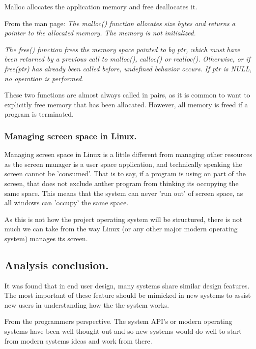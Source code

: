 \documentclass[a4paper]{report}
\begin{document}
Malloc allocates the application memory and free deallocates it.

From the man page:
\textit{The malloc() function allocates size bytes and returns a pointer to the allocated memory.  The memory is not initialized.}

\textit{The free() function frees the memory space pointed  to  by  ptr,  which must  have  been  returned  by a previous call to malloc(), calloc() or realloc().  Otherwise, or if free(ptr) has already been called  before, undefined behavior occurs.  If ptr is NULL, no operation is performed.} \cite{manMalloc}

These two functions are almost always called in pairs, as it is common to want to explicitly free memory that has been allocated. However, all memory is freed if a program is terminated.


\subsubsection*{Managing screen space in Linux.}

Managing screen space in Linux is a little different from managing other resources as the screen manager is a user space application, and technically speaking the screen cannot be 'consumed'. That is to say, if a program is using on part of the screen, that does not exclude anther program from thinking its occupying the same space. This means that the system can never 'run out' of screen space, as all windows can 'occupy' the same space.

As this is not how the project operating system will be structured, there is not much we can take from the way Linux (or any other major modern operating system) manages its screen.


\subsection*{Analysis conclusion.}

It was found that in end user design, many systems share similar design features. The most important of these feature should be mimicked in new systems to assist new users in understanding how the the system works.

From the programmers perspective. The system API's or modern operating systems have been well thought out and so new systems would do well to start from modern systems ideas and work from there.
\end{document}
